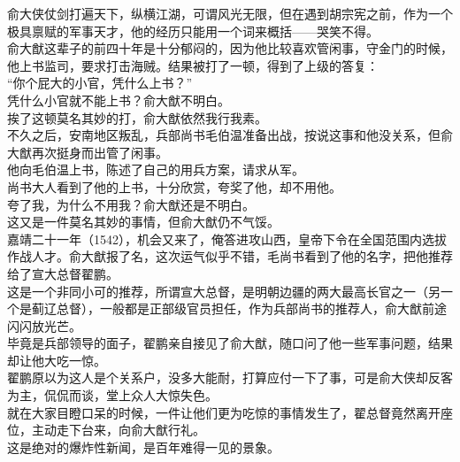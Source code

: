 \begin{multicols}{\theparacolNo}
俞大侠仗剑打遍天下，纵横江湖，可谓风光无限，但在遇到胡宗宪之前，作为一个极具禀赋的军事天才，他的经历只能用一个词来概括——哭笑不得。\\

俞大猷这辈子的前四十年是十分郁闷的，因为他比较喜欢管闲事，守金门的时候，他上书监司，要求打击海贼。结果被打了一顿，得到了上级的答复：\\

“你个屁大的小官，凭什么上书？”\\

凭什么小官就不能上书？俞大猷不明白。\\

挨了这顿莫名其妙的打，俞大猷依然我行我素。\\

不久之后，安南地区叛乱，兵部尚书毛伯温准备出战，按说这事和他没关系，但俞大猷再次挺身而出管了闲事。\\

他向毛伯温上书，陈述了自己的用兵方案，请求从军。\\

尚书大人看到了他的上书，十分欣赏，夸奖了他，却不用他。\\

夸了我，为什么不用我？俞大猷还是不明白。\\

这又是一件莫名其妙的事情，但俞大猷仍不气馁。\\

嘉靖二十一年（1542），机会又来了，俺答进攻山西，皇帝下令在全国范围内选拔作战人才。俞大猷报了名，这次运气似乎不错，毛尚书看到了他的名字，把他推荐给了宣大总督翟鹏。\\

这是一个非同小可的推荐，所谓宣大总督，是明朝边疆的两大最高长官之一（另一个是蓟辽总督），一般都是正部级官员担任，作为兵部尚书的推荐人，俞大猷前途闪闪放光芒。\\

毕竟是兵部领导的面子，翟鹏亲自接见了俞大猷，随口问了他一些军事问题，结果却让他大吃一惊。\\

翟鹏原以为这人是个关系户，没多大能耐，打算应付一下了事，可是俞大侠却反客为主，侃侃而谈，堂上众人大惊失色。\\

就在大家目瞪口呆的时候，一件让他们更为吃惊的事情发生了，翟总督竟然离开座位，主动走下台来，向俞大猷行礼。\\

这是绝对的爆炸性新闻，是百年难得一见的景象。\\


\end{multicols}
